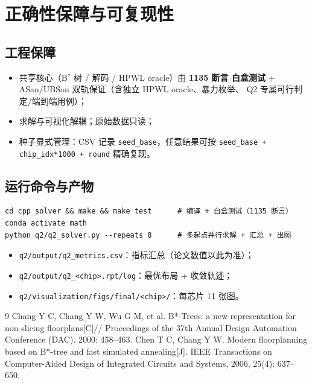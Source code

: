 \documentclass[12pt,a4paper]{article}
\begin{document}
\section{正确性保障与可复现性}

\subsection{工程保障}

\begin{itemize}
    \item 共享核心（B$^*$ 树 / 解码 / HPWL oracle）由 \textbf{1135 断言
    白盒测试} + ASan/UBSan 双轨保证（含独立 HPWL oracle、暴力枚举、
    Q2 专属可行判定/端到端用例）；
    \item 求解与可视化解耦；原始数据只读；
    \item 种子显式管理：CSV 记录 \texttt{seed\_base}，任意结果可按
    \texttt{seed\_base + chip\_idx*1000 + round} 精确复现。
\end{itemize}

\subsection{运行命令与产物}

{\small
\begin{verbatim}
cd cpp_solver && make && make test      # 编译 + 白盒测试（1135 断言）
conda activate math
python q2/q2_solver.py --repeats 8      # 多起点并行求解 + 汇总 + 出图
\end{verbatim}
}

\begin{itemize}
    \item \texttt{q2/output/q2\_metrics.csv}：指标汇总（论文数值以此为准）；
    \item \texttt{q2/output/q2\_<chip>.rpt/log}：最优布局 + 收敛轨迹；
    \item \texttt{q2/visualization/figs/final/<chip>/}：每芯片 11 张图。
\end{itemize}

\begin{thebibliography}{9}
 Chang Y C, Chang Y W, Wu G M, et al. B*-Trees: a new
  representation for non-slicing floorplans[C]// Proceedings of the 37th
  Annual Design Automation Conference (DAC). 2000: 458--463.
 Chen T C, Chang Y W. Modern floorplanning based on B*-tree
  and fast simulated annealing[J]. IEEE Transactions on Computer-Aided
  Design of Integrated Circuits and Systems, 2006, 25(4): 637--650.
\end{thebibliography}
\end{document}
